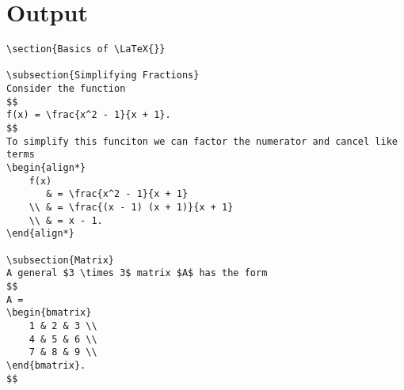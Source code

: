 \section{Output}


\newpage
\begin{verbatim}
\section{Basics of \LaTeX{}}

\subsection{Simplifying Fractions}
Consider the function
$$
f(x) = \frac{x^2 - 1}{x + 1}.
$$
To simplify this funciton we can factor the numerator and cancel like terms
\begin{align*}
    f(x)
       & = \frac{x^2 - 1}{x + 1}
    \\ & = \frac{(x - 1) (x + 1)}{x + 1}
    \\ & = x - 1.
\end{align*}

\subsection{Matrix}
A general $3 \times 3$ matrix $A$ has the form
$$
A =
\begin{bmatrix}
    1 & 2 & 3 \\
    4 & 5 & 6 \\
    7 & 8 & 9 \\
\end{bmatrix}.
$$


\end{verbatim}
